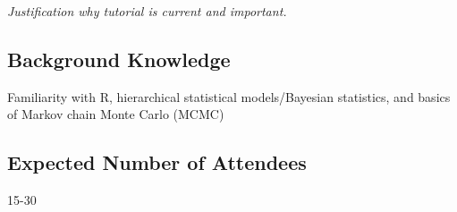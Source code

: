 \documentclass[]{article}
\begin{document}
\emph{Justification why tutorial is current and important.}

\subsection{Background Knowledge}\label{background-knowledge}

Familiarity with R, hierarchical statistical models/Bayesian statistics, and basics of Markov chain Monte Carlo (MCMC)

\subsection{Expected Number of
Attendees}\label{expected-number-of-attendees}

15-30
\end{document}
